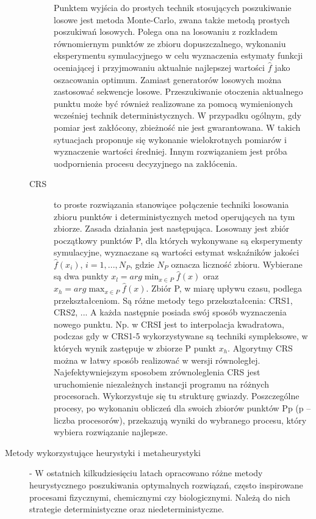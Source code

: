 \begin{description}
\begin{description}
        Punktem wyjścia do prostych technik stosujących poszukiwanie losowe jest metoda Monte-Carlo, zwana także metodą prostych poszukiwań losowych. Polega ona na losowaniu z rozkładem równomiernym punktów ze zbioru dopuszczalnego, wykonaniu eksperymentu symulacyjnego w celu wyznaczenia estymaty funkcji oceniającej i przyjmowaniu aktualnie najlepszej wartości $\hat{f}$ jako oszacowania optimum. Zamiast generatorów losowych można zastosować sekwencje losowe. Przeszukiwanie otoczenia aktualnego punktu może być również realizowane za pomocą wymienionych wcześniej technik deterministycznych. W przypadku ogólnym, gdy pomiar jest zakłócony, zbieżność nie jest gwarantowana. W takich sytuacjach proponuje się wykonanie wielokrotnych pomiarów i wyznaczenie wartości średniej. Innym rozwiązaniem jest próba uodpornienia procesu decyzyjnego na zakłócenia.
        \item[CRS] to proste rozwiązania stanowiące połączenie techniki losowania zbioru punktów i deterministycznych metod operujących na tym zbiorze. Zasada działania jest następująca. Losowany jest zbiór początkowy punktów P, dla których wykonywane są eksperymenty symulacyjne, wyznaczane są wartości estymat wskaźników jakości $\hat{f}(x_i)$, $i=1,...,N_P$, gdzie $N_P$ oznacza liczność zbioru. Wybierane są dwa punkty $x_l = arg \min_{x\in P} \hat{f}(x)$ oraz $x_h = arg \max_{x\in P} \hat{f}(x)$. Zbiór P, w miarę upływu czasu, podlega przekształceniom. Są różne metody tego przekształcenia: CRS1, CRS2, ... A każda następnie posiada swój sposób wyznaczenia nowego punktu. Np. w CRSI jest to interpolacja kwadratowa, podczas gdy w CRS1-5 wykorzystywane są techniki sympleksowe, w których wynik zastępuje w zbiorze P punkt $x_h$. Algorytmy CRS można w łatwy sposób realizować w wersji równoległej. Najefektywniejszym sposobem zrównoleglenia CRS jest uruchomienie niezależnych instancji programu na różnych procesorach. Wykorzystuje się tu strukturę gwiazdy. Poszczególne procesy, po wykonaniu obliczeń dla swoich zbiorów punktów Pp (p – liczba procesorów), przekazują wyniki do wybranego procesu, który wybiera rozwiązanie najlepsze.
    \end{description}
    \item[Metody wykorzystujące heurystyki i metaheurystyki] - W ostatnich kilkudziesięciu latach opracowano różne metody heurystycznego poszukiwania optymalnych rozwiązań, często inspirowane procesami fizycznymi, chemicznymi czy biologicznymi. Należą do nich strategie deterministyczne oraz niedeterministyczne.\mbox{}
    \begin{description}

\end{description}
\end{description}
